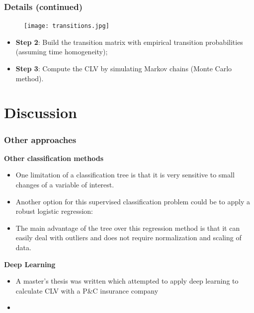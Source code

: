 \documentclass[aspectratio=169,xcolor=x11names,compress]{beamer}
\begin{document}
\begin{frame}
\frametitle{Details (continued)}

\begin{figure}
	\texttt{[image: transitions.jpg]}
\end{figure}
	
\begin{itemize}
	\item \textbf{Step 2}: Build the transition matrix with empirical transition probabilities (assuming time homogeneity);
	\item \textbf{Step 3}: Compute the CLV by simulating Markov chains (Monte Carlo method).
\end{itemize}
\end{frame}

\section{Discussion}

\begin{frame}
\frametitle{Other approaches}

\textbf{Other classification methods}

\begin{itemize}
    \item One limitation of a classification tree is that it is very sensitive to small changes of a variable of interest.
    \item Another option for this supervised classification problem could be to apply a robust logistic regression: 
    \item The main advantage of the tree over this regression method is that it can easily deal with outliers and does not require normalization and scaling of data.
\end{itemize}

\textbf{Deep Learning}

\begin{itemize}
    \item A master's thesis was written which attempted to apply deep learning to calculate CLV with a P$\&$C insurance company
    \item {}
\end{itemize}

\end{frame}
\end{document}
